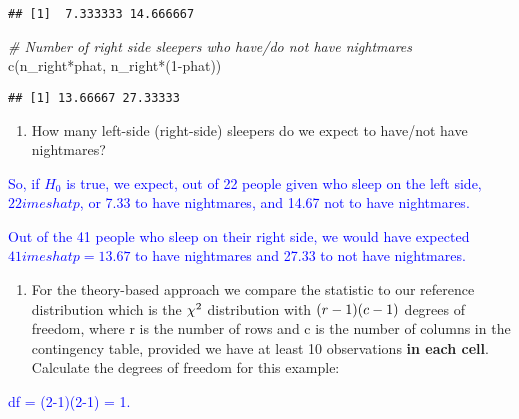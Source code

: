 \documentclass[
]{article}
\newenvironment{Shaded}{\begin{snugshade}}{\end{snugshade}}
\newcommand{\CommentTok}[1]{\textcolor[rgb]{0.56,0.35,0.01}{\textit{#1}}}
\newcommand{\DecValTok}[1]{\textcolor[rgb]{0.00,0.00,0.81}{#1}}
\newcommand{\FunctionTok}[1]{\textcolor[rgb]{0.00,0.00,0.00}{#1}}
\newcommand{\NormalTok}[1]{#1}
\newcommand{\SpecialCharTok}[1]{\textcolor[rgb]{0.00,0.00,0.00}{#1}}
\providecommand{\tightlist}{%
  \setlength{\itemsep}{0pt}\setlength{\parskip}{0pt}}
\begin{document}
\begin{verbatim}
## [1]  7.333333 14.666667
\end{verbatim}

\begin{Shaded}
\begin{Highlighting}[]
\CommentTok{\# Number of right side sleepers who have/do not have nightmares}
\FunctionTok{c}\NormalTok{(n\_right}\SpecialCharTok{*}\NormalTok{phat, n\_right}\SpecialCharTok{*}\NormalTok{(}\DecValTok{1}\SpecialCharTok{{-}}\NormalTok{phat))}
\end{Highlighting}
\end{Shaded}

\begin{verbatim}
## [1] 13.66667 27.33333
\end{verbatim}

\begin{enumerate}
\def\labelenumi{(\arabic{enumi})}
\setcounter{enumi}{9}
\tightlist
\item
  How many left-side (right-side) sleepers do we expect to have/not have
  nightmares?
\end{enumerate}

\textcolor{blue}{So, if $H_0$  is true, we expect, out of 22 people given who sleep on the left side, $22   imes hat{p}$, or 7.33 to have nightmares, and 14.67 not to have nightmares.}

\textcolor{blue}{Out of the 41 people who sleep on their right side, we would have expected $ 41    imes hat{p} = 13.67$ to have nightmares and 27.33 to not have nightmares.}

\vspace{0.5in}

\begin{enumerate}
\def\labelenumi{(\arabic{enumi})}
\setcounter{enumi}{10}
\tightlist
\item
  For the theory-based approach we compare the statistic to our
  reference distribution which is the \(\small \chi^2\) distribution
  with \(\small (r-1)(c-1)\) degrees of freedom, where r is the number
  of rows and c is the number of columns in the contingency table,
  provided we have at least 10 observations \textbf{in each cell}.
  Calculate the degrees of freedom for this example:
\end{enumerate}

\textcolor{blue}{df = (2-1)(2-1) = 1.}

\vspace{0.25in}
\end{document}
